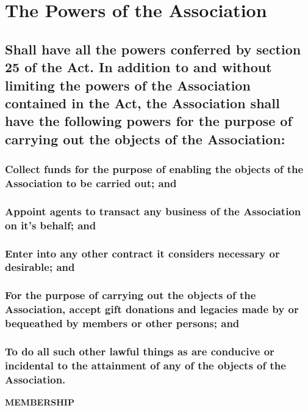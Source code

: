 \documentclass{article}
\newenvironment{subs}
  {\adjustwidth{2em}{0pt}}
  {\endadjustwidth}
\begin{document}
\section{The Powers of the Association}
\begin{subs}
\subsection{Shall have all the powers conferred by section 25 of the Act. In addition to and without limiting the powers of the Association contained in the Act, the Association shall have the following powers for the purpose of carrying out the objects of the Association:}
\begin{subs}
\subsubsection{Collect funds for the purpose of enabling the objects of the Association to be carried out; and}
\subsubsection{Appoint agents to transact any business of the Association on it's behalf; and}
\subsubsection{Enter into any other contract it considers necessary or desirable; and}
\subsubsection{For the purpose of carrying out the objects of the Association, accept gift donations and legacies made by or bequeathed by members or other persons; and}
\subsubsection{To do all such other lawful things as are conducive or incidental to the attainment of any of the objects of the Association.}
\end{subs}
\end{subs}

\vspace{5mm}
{\large\bf MEMBERSHIP\par}
\hrulefill
\vspace{5mm}
\end{document}
